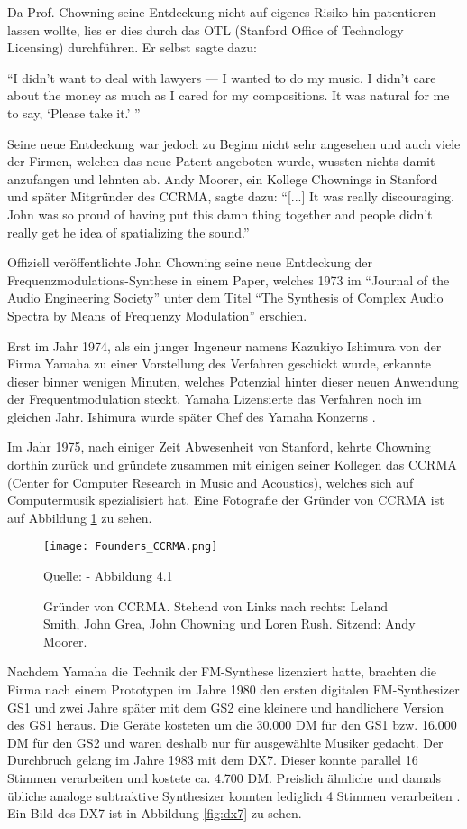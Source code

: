 Da Prof. Chowning seine Entdeckung nicht auf eigenes Risiko hin patentieren lassen wollte, lies er dies durch das OTL (Stanford Office of Technology Licensing) durchführen. Er selbst sagte dazu:

``I didn’t want to deal with lawyers — I wanted to do my music. I didn’t care about the money as much as I cared for my compositions. It was natural for me to say, `Please take it.' ''\cite{fatherofdigitalmusik}

 Seine neue Entdeckung war jedoch zu Beginn nicht sehr angesehen und auch viele der Firmen, welchen das neue Patent angeboten wurde, wussten nichts damit anzufangen und lehnten ab. Andy Moorer, ein Kollege Chownings in Stanford und später Mitgründer des CCRMA, sagte dazu: ``[...] It was really discouraging. John was so proud of having put this damn thing together and people didn't really get he idea of spatializing the sound.''\cite[s. xy]{soundofinnovation}

Offiziell veröffentlichte John Chowning seine neue Entdeckung der Frequenzmodulations-Synthese in einem Paper, welches 1973 im ``Journal of the Audio Engineering Society'' unter dem Titel ``The Synthesis of Complex Audio Spectra by Means of Frequenzy Modulation'' erschien.

Erst im Jahr 1974, als ein junger Ingeneur namens Kazukiyo Ishimura von der Firma Yamaha zu einer Vorstellung des Verfahren geschickt wurde, erkannte dieser binner wenigen Minuten, welches Potenzial hinter dieser neuen Anwendung der Frequentmodulation steckt. Yamaha Lizensierte das Verfahren noch im gleichen Jahr. Ishimura wurde später Chef des Yamaha Konzerns \cite{fatherofdigitalmusik}.

Im Jahr 1975, nach einiger Zeit Abwesenheit von Stanford, kehrte Chowning dorthin zurück und gründete zusammen mit einigen seiner Kollegen das CCRMA (Center for Computer Research in Music and Acoustics), welches sich auf Computermusik spezialisiert hat.
Eine Fotografie der Gründer von CCRMA ist auf Abbildung \ref{fig:foundersCCRMA} zu sehen.

\begin{figure} [ht]
\centering
  \texttt{[image: Founders\_CCRMA.png]}
\caption{Gründer von CCRMA. Stehend von Links nach rechts: Leland Smith, John Grea, John Chowning und Loren Rush. Sitzend: Andy Moorer.}
\label{fig:foundersCCRMA}
Quelle: \cite{soundofinnovation} - Abbildung 4.1
\end{figure}

Nachdem Yamaha die Technik der FM-Synthese lizenziert hatte, brachten die Firma nach einem Prototypen im Jahre 1980 den ersten digitalen FM-Synthesizer GS1 und zwei Jahre später mit dem GS2 eine kleinere und handlichere Version des GS1 heraus. Die Geräte kosteten um die 30.000 DM für den GS1 bzw. 16.000 DM für den GS2 und waren deshalb nur für ausgewählte Musiker gedacht. Der Durchbruch gelang im Jahre 1983 mit dem DX7. Dieser konnte parallel 16 Stimmen verarbeiten und kostete ca. 4.700 DM. Preislich ähnliche und damals übliche analoge subtraktive Synthesizer konnten lediglich 4 Stimmen verarbeiten \cite{fmGS1}. Ein Bild des DX7 ist in Abbildung \ref{fig:dx7} zu sehen.

